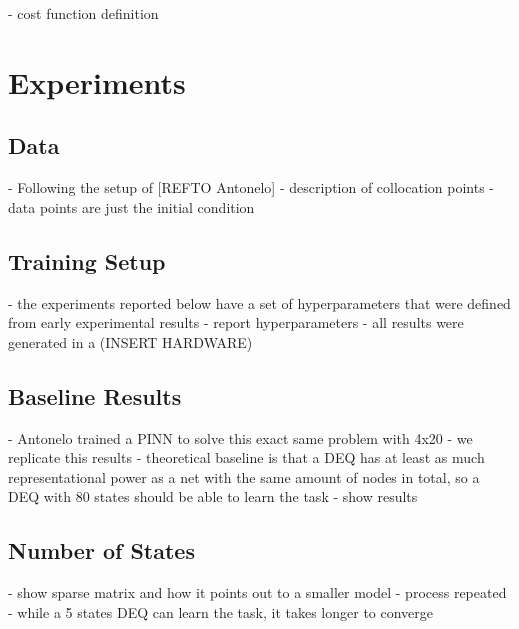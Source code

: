 - cost function definition


\section{Experiments}

\subsection{Data}

- Following the setup of [REFTO Antonelo] 
- description of collocation points
- data points are just the initial condition

\subsection{Training Setup}

- the experiments reported below have a set of hyperparameters that were defined from early experimental results
- report hyperparameters
- all results were generated in a (INSERT HARDWARE)

\subsection{Baseline Results}

- Antonelo trained a PINN to solve this exact same problem with 4x20
- we replicate this results
- theoretical baseline is that a DEQ has at least as much representational power as a net with the same amount of nodes in total, so a DEQ with 80 states should be able to learn the task
- show results

\subsection{Number of States}

- show sparse matrix and how it points out to a smaller model
- process repeated
- while a 5 states DEQ can learn the task, it takes longer to converge


